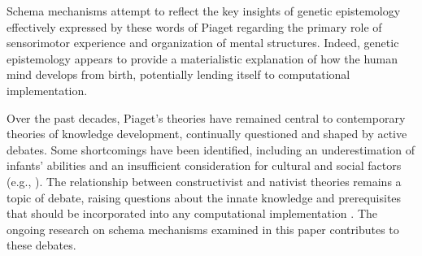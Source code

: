 \documentclass[runningheads]{llncs}
\begin{document}
Schema mechanisms attempt to reflect the key insights of genetic epistemology effectively expressed by these words of Piaget regarding the primary role of sensorimotor experience and organization of mental structures. 
Indeed, genetic epistemology appears to provide a materialistic explanation of how the human mind develops from birth, potentially lending itself to computational implementation.

Over the past decades, Piaget's theories have remained central to contemporary theories of knowledge development, continually questioned and shaped by active debates.
Some shortcomings have been identified, including an underestimation of infants' abilities and an insufficient consideration for cultural and social factors (e.g., \cite{soran_university_piagets_2019}).
The relationship between constructivist and nativist theories remains a topic of debate, raising questions about the innate knowledge and prerequisites that should be incorporated into any computational implementation \cite[p. 41]{drescher_made-up_1991}.
The ongoing research on schema mechanisms examined in this paper contributes to these debates.









%
\end{document}
